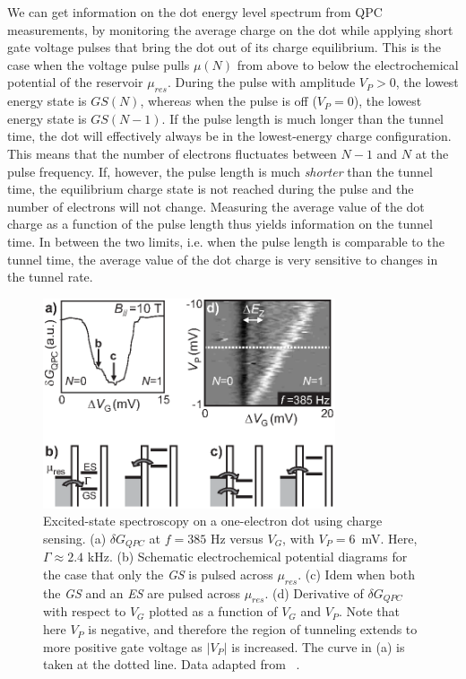 \documentclass[rmp,twocolumn,aps]{revtex4}
\begin{document}
We can get information on the dot energy level spectrum from QPC measurements, by monitoring the average charge on the
dot while applying short gate voltage pulses that bring the dot
out of its charge equilibrium. This is the case when the voltage
pulse pulls $\mu(N)$ from above to below the electrochemical
potential of the reservoir $\mu_{res}$. During the pulse with
amplitude $V_P>0$, the lowest energy state is $GS(N)$, whereas
when the pulse is off ($V_P=0$), the lowest energy state is
$GS(N-1)$. If the pulse length is much longer than the tunnel
time, the dot will effectively always be in the lowest-energy
charge configuration. This means that the number of electrons
fluctuates between $N-1$ and $N$ at the pulse frequency. If,
however, the pulse length is much \textit{shorter} than the tunnel
time, the equilibrium charge state is not reached during the pulse
and the number of electrons will not change. Measuring the average
value of the dot charge as a function of the pulse length thus
yields information on the tunnel time. In between the two limits,
i.e. when the pulse length is comparable to the tunnel time, the
average value of the dot charge is very sensitive to changes in
the tunnel rate.

\begin{figure}[htb]
\includegraphics[width=3.4in]{hanson_fig12.eps}
\caption{Excited-state spectroscopy on a one-electron dot using
charge sensing. (a) $\delta G_{QPC}$ at $f = 385$ Hz versus $V_G$,
with $V_{P} = 6$~mV. Here, $\Gamma \approx 2.4$ kHz. (b) Schematic
electrochemical potential diagrams for the case that only the
\textit{GS} is pulsed across $\mu_{res}$. (c) Idem when both the
\textit{GS} and an \textit{ES} are pulsed across $\mu_{res}$. (d)
Derivative of $\delta G_{QPC}$ with respect to $V_G$ plotted as a
function of $V_G$ and $V_P$. Note that here $V_P$ is negative, and
therefore the region of tunneling extends to more positive gate
voltage as $|V_P|$ is increased. The curve in (a) is taken at the
dotted line. Data adapted from ~\textcite{ElzermanAPL2004}.}
\label{fig:ZeemanCharge}
\end{figure}
\end{document}
